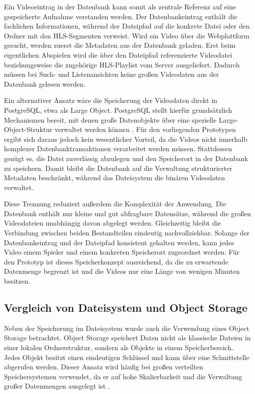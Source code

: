 Ein Videoeintrag in der Datenbank kann somit als zentrale Referenz auf eine gespeicherte Aufnahme verstanden werden. Der Datenbankeintrag enthält die fachlichen Informationen, während der Dateipfad auf die konkrete Datei oder den Ordner mit den HLS-Segmenten verweist. 
Wird ein Video über die Webplattform gesucht, werden zuerst die Metadaten aus der Datenbank geladen. Erst beim eigentlichen Abspielen wird die über den Dateipfad referenzierte Videodatei beziehungsweise die zugehörige HLS-Playlist vom Server ausgeliefert. 
Dadurch müssen bei Such- und Listenansichten keine großen Videodaten aus der Datenbank gelesen werden. 

Ein alternativer Ansatz wäre die Speicherung der Videodaten direkt in PostgreSQL, etwa als Large Object. PostgreSQL stellt hierfür grundsätzlich Mechanismen bereit, mit denen große Datenobjekte über eine spezielle Large-Object-Struktur verwaltet werden können \cite{2026}. 
Für den vorliegenden Prototypen ergibt sich daraus jedoch kein wesentlicher Vorteil, da die Videos nicht innerhalb komplexer Datenbanktransaktionen verarbeitet werden müssen. Stattdessen genügt es, die Datei zuverlässig abzulegen und den Speicherort in der Datenbank zu speichern. 
Damit bleibt die Datenbank auf die Verwaltung strukturierter Metadaten beschränkt, während das Dateisystem die binären Videodaten verwaltet. 

Diese Trennung reduziert außerdem die Komplexität der Anwendung. Die Datenbank enthält nur kleine und gut abfragbare Datensätze, während die großen Videodateien unabhängig davon abgelegt werden. Gleichzeitig bleibt die Verbindung zwischen beiden Bestandteilen eindeutig nachvollziehbar. 
Solange der Datenbankeintrag und der Dateipfad konsistent gehalten werden, kann jedes Video einem Spieler und einem konkreten Speicherort zugeordnet werden. Für den Prototyp ist dieses Speicherkonzept ausreichend, 
da die zu erwartende Datenmenge begrenzt ist und die Videos nur eine Länge von wenigen Minuten besitzen.

\subsection{Vergleich von Dateisystem und Object Storage} 

Neben der Speicherung im Dateisystem wurde auch die Verwendung eines Object Storage betrachtet. Object Storage speichert Daten nicht als klassische Dateien in einer lokalen Ordnerstruktur, sondern als Objekte in einem Speicherbereich. 
Jedes Objekt besitzt einen eindeutigen Schlüssel und kann über eine Schnittstelle abgerufen werden. Dieser Ansatz wird häufig bei großen verteilten Speichersystemen verwendet, da er auf hohe Skalierbarkeit und die Verwaltung großer Datenmengen ausgelegt ist \cite{sears_van_ingen_gray_2006}. 

